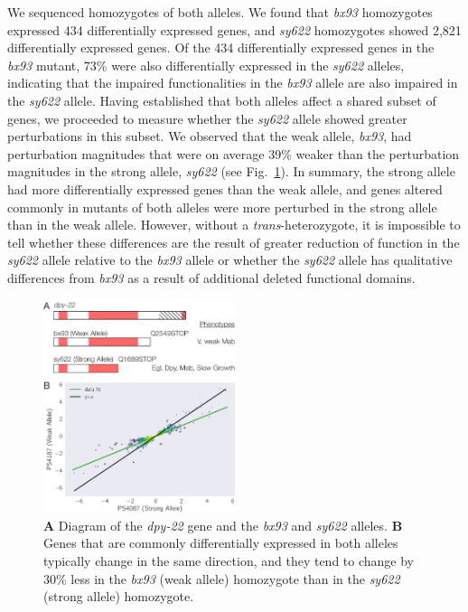 \documentclass[10pt, onecolumn]{article}
\newcommand{\gene}[1]{\mbox{\emph{#1}}}
\newcommand{\strongn}{2,821}
\newcommand{\weakn}{434}
\begin{document}
We sequenced homozygotes of both alleles. We found that \emph{bx93} homozygotes
expressed \weakn{} differentially expressed genes, and \emph{sy622} homozygotes
showed \strongn{} differentially expressed genes. Of the \weakn{} differentially
expressed genes in the \emph{bx93} mutant, 73\% were also differentially
expressed in the \emph{sy622} alleles, indicating that the impaired
functionalities in the \emph{bx93} allele are also impaired in the \emph{sy622}
allele. Having established that both alleles affect a shared subset of genes, we
proceeded to measure whether the \emph{sy622} allele showed greater
perturbations in this subset. We observed that the weak allele, \emph{bx93}, had
perturbation magnitudes that were on average 39\% weaker than the perturbation
magnitudes in the strong allele, \emph{sy622} (see Fig.~\ref{fig:dpy22}). In
summary, the strong allele had more differentially expressed genes than the weak
allele, and genes altered commonly in mutants of both alleles were more
perturbed in the strong allele than in the weak allele. However, without a
\emph{trans}-heterozygote, it is impossible to tell whether these
differences are the result of greater reduction of function in the \emph{sy622}
allele relative to the \emph{bx93} allele or whether the
\emph{sy622} allele has qualitative differences from \emph{bx93} as a result of
additional deleted functional domains.

\begin{figure}
  \centering{}
  \includegraphics[width=0.5\textwidth]{../figs/dpy22_allele_comparison.pdf}
  \caption{
  \textbf{A} Diagram of the \gene{dpy-22} gene and the \emph{bx93} and \emph{sy622}
  alleles.
  \textbf{B} Genes that are commonly differentially expressed in both alleles
  typically change in the same direction, and they tend to change by 30\% less
  in the \emph{bx93} (weak allele) homozygote than in the \emph{sy622} (strong
  allele) homozygote.
  }
\label{fig:dpy22}
\end{figure}
\end{document}
